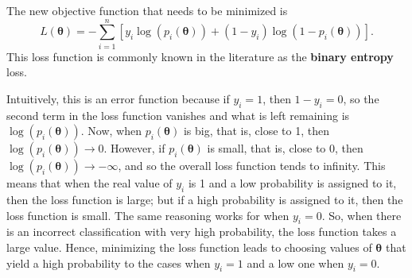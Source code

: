 The new objective function that needs to be minimized is
\begin{equation}
  \label{eq:logistic_example_loss_function}
  L(\boldsymbol{\theta}) = - \sum_{i = 1}^n \left[ y_i \log\left( p_i(\boldsymbol{\theta}) \right) + (1 - y_i) \log \left( 1 - p_i(\boldsymbol{\theta}) \right) \right].
\end{equation}
This loss function is commonly known in the literature as the \textbf{binary entropy} loss.

Intuitively, this is an error function because if $y_i = 1$, then $1 - y_i = 0$, so the second term in the loss function vanishes and what is left remaining is $\log\left( p_i(\boldsymbol{\theta}) \right)$. Now, when $p_i(\boldsymbol{\theta})$ is big, that is, close to 1, then $\log\left( p_i(\boldsymbol{\theta}) \right) \to 0$. However, if $p_i(\boldsymbol{\theta})$ is small, that is, close to 0, then $\log\left( p_i(\boldsymbol{\theta}) \right) \to -\infty$, and so the overall loss function tends to infinity. This means that when the real value of $y_i$ is 1 and a low probability is assigned to it, then the loss function is large; but if a high probability is assigned to it, then the loss function is small. The same reasoning works for when $y_i = 0$. So, when there is an incorrect classification with very high probability, the loss function takes a large value.
Hence, minimizing the loss function leads to choosing values of $\boldsymbol{\theta}$ that yield a high probability to the cases when $y_i = 1$ and a low one when $y_i = 0$.


